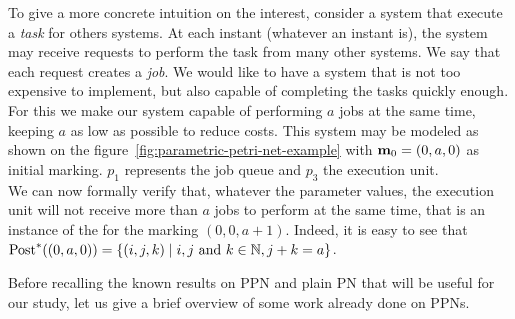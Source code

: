 To give a more concrete intuition on the interest, consider a system that execute a \emph{task} for others systems.
At each instant (whatever an instant is), the system may receive requests to perform the task from many other systems. We say that each request creates a \emph{job}.
We would like to have a system that is not too expensive to implement, but also capable of completing the tasks quickly enough.
For this we make our system capable of performing $a$ jobs at the same time, keeping $a$ as low as possible to reduce costs.
This system may be modeled as shown on the figure~\ref{fig:parametric-petri-net-example} with $\mathbf{m}_0 = (0, a, 0)$ as initial marking.
$p_1$ represents the job queue and $p_3$ the execution unit.\\
We can now formally verify that, whatever the parameter values, the execution unit will not receive more than $a$ jobs to perform at the same time, that is an instance of the \Ecov for the marking $(0, 0, a+1)$. Indeed, it is easy to see that $\operatorname{Post}^*((0, a, 0)) = \{(i, j, k) \mid i, j \text{ and } k \in \mathbb{N}, j + k = a\}$.

Before recalling the known results on \ac{PPN} and plain \ac{PN} that will be useful for our study, let us give a brief overview of some work already done on \acp{PPN}.


